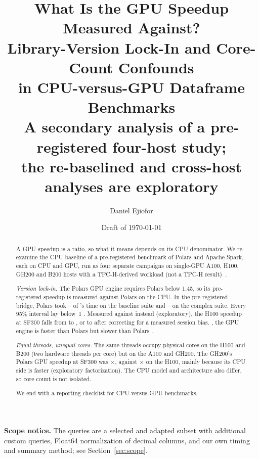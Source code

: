 \documentclass[11pt]{article}
\title{What Is the GPU Speedup Measured Against?\\
  Library-Version Lock-In and Core-Count Confounds\\
  in CPU-versus-GPU Dataframe Benchmarks\\[4pt]
  \large A secondary analysis of a pre-registered four-host study;\\
  the re-baselined and cross-host analyses are exploratory}
\author{Daniel Ejiofor}
\affil{Boston University, Boston, MA, USA}
\affil{\href{mailto:ejiod@bu.edu}{\texttt{ejiod@bu.edu}}}
\date{Draft of \today\watermarknotice}
\begin{document}
\maketitle

\begin{abstract}
A GPU speedup is a ratio, so what it means depends on its CPU denominator. We re-examine the CPU baseline of a pre-registered benchmark of Polars and Apache
Spark, each on CPU and GPU, run as four separate campaigns on single-GPU A100,
H100, GH200 and B200 hosts with a TPC-H-derived workload (not a TPC-H
result)~\citep{ejiofor2026companion}.

\emph{Version lock-in.} The Polars GPU engine requires Polars below 1.45, so
its pre-registered speedup is measured against Polars \polarsold{} on the CPU.
In the pre-registered bridge, Polars \polarsnew{} took
-- of
\polarsold's time on the baseline suite and
-- on the complex
suite. Every 95\% interval lay below~1
.
Measured against \polarsnew{} instead (exploratory), the H100 speedup at SF300
falls from  to
, or to
 after correcting for a
measured session bias. , the GPU engine is faster
than Polars \polarsold{} but slower than Polars
\polarsnew{}.

\emph{Equal threads, unequal cores.} The same  threads occupy
 physical cores on the H100 and B200 (two hardware
threads per core) but  on the A100 and
GH200. The GH200's Polars GPU speedup at SF300 was
$\times$, against
$\times$ on the H100, mainly because its CPU
side is faster (exploratory
factorization). The CPU model and architecture also
differ, so core count is not isolated.

We end with a reporting checklist for CPU-versus-GPU benchmarks.
\end{abstract}

\noindent\textbf{Scope notice.} \tpcdisclaimer{} The queries are a selected
and adapted subset with additional custom queries, Float64 normalization of
decimal columns, and our own timing and summary method; see
Section~\ref{sec:scope}.
\end{document}
